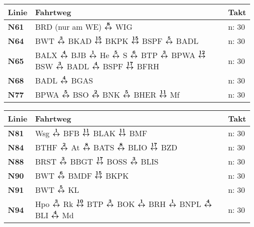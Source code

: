 \begin{minipage}[t]{0.05\textwidth}
\phantom{Tor}
\end{minipage}
\begin{minipage}[t]{0.45\textwidth}
\begin{tabular}{>{\bfseries}L{1.2cm}L{9.0cm}L{3.0cm}}
{\bfseries Linie} & {\bfseries Fahrtweg} & {\bfseries Takt} \\
\hline
\nbus{} N61   & BRD (nur am WE) $\boldsymbol{\overset{8}{\leftrightarrow}}$ WIG                                     & n: 30                      \\
\nbus{} N64   & BWT $\boldsymbol{\overset{3}{\leftrightarrow}}$ BKAD $\boldsymbol{\overset{15}{\leftrightarrow}}$ BKPK $\boldsymbol{\overset{15}{\leftrightarrow}}$ BSPF $\boldsymbol{\overset{5}{\leftrightarrow}}$ BADL & n: 30 \\
\nbus{} N65   & BALX $\boldsymbol{\overset{4}{\leftrightarrow}}$ BJB $\boldsymbol{\overset{1}{\leftrightarrow}}$ He $\boldsymbol{\overset{5}{\leftrightarrow}}$ S $\boldsymbol{\overset{6}{\leftrightarrow}}$ BTP $\boldsymbol{\overset{3}{\leftrightarrow}}$ BPWA $\boldsymbol{\overset{12}{\leftrightarrow}}$ BSW $\boldsymbol{\overset{3}{\leftrightarrow}}$ BADL
$\boldsymbol{\overset{4}{\leftrightarrow}}$ BSPF $\boldsymbol{\overset{17}{\leftrightarrow}}$ BFRH & n: 30                      \\
\nbus{} N68   & BADL $\boldsymbol{\overset{4}{\leftrightarrow}}$ BGAS                                                                                                                                               & n: 30                      \\
\nbus{} N77   & BPWA $\boldsymbol{\overset{5}{\leftrightarrow}}$ BSO $\boldsymbol{\overset{2}{\leftrightarrow}}$ BNK $\boldsymbol{\overset{5}{\leftrightarrow}}$ BHER $\boldsymbol{\overset{11}{\leftrightarrow}}$ Mf                                                                                               & n: 30                      \\
\hline
\end{tabular}
\end{minipage}
\begin{minipage}[t]{0.45\textwidth}
\begin{tabular}{>{\bfseries}L{1.2cm}L{9.0cm}L{3.0cm}}
{\bfseries Linie} & {\bfseries Fahrtweg} & {\bfseries Takt} \\
\hline
\nbus{} N81   & Wsg $\boldsymbol{\overset{1}{\leftrightarrow}}$ BFB $\boldsymbol{\overset{11}{\leftrightarrow}}$ BLAK $\boldsymbol{\overset{11}{\leftrightarrow}}$ BMF                                                                                                              & n: 30                      \\
\nbus{} N84   & BTHF $\boldsymbol{\overset{2}{\leftrightarrow}}$ At $\boldsymbol{\overset{8}{\leftrightarrow}}$ BATS $\boldsymbol{\overset{8}{\leftrightarrow}}$ BLIO $\boldsymbol{\overset{17}{\leftrightarrow}}$ BZD                                                                                              & n: 30                      \\
\nbus{} N88   & BRST $\boldsymbol{\overset{3}{\leftrightarrow}}$ BBGT $\boldsymbol{\overset{17}{\leftrightarrow}}$ BOSS $\boldsymbol{\overset{3}{\leftrightarrow}}$ BLIS
& n: 30                      \\
\nbus{} N90   & BWT $\boldsymbol{\overset{6}{\leftrightarrow}}$ BMDF $\boldsymbol{\overset{15}{\leftrightarrow}}$ BKPK                                                                                                                              & n: 30                      \\
\nbus{} N91   & BWT $\boldsymbol{\overset{5}{\leftrightarrow}}$ KL                                                                                                                                                  & n: 30                      \\
\nbus{} N94   & Hpo $\boldsymbol{\overset{3}{\leftrightarrow}}$ Rk $\boldsymbol{\overset{10}{\leftrightarrow}}$ BTP $\boldsymbol{\overset{3}{\leftrightarrow}}$ BOK $\boldsymbol{\overset{1}{\leftrightarrow}}$ BRH $\boldsymbol{\overset{1}{\leftrightarrow}}$ BNPL $\boldsymbol{\overset{4}{\leftrightarrow}}$ BLI $\boldsymbol{\overset{4}{\leftrightarrow}}$ Md                                                 & n: 30                      \\
\hline
\end{tabular}
\end{minipage}
\begin{minipage}[t]{0.05\textwidth}
\phantom{Tor}
\end{minipage}

